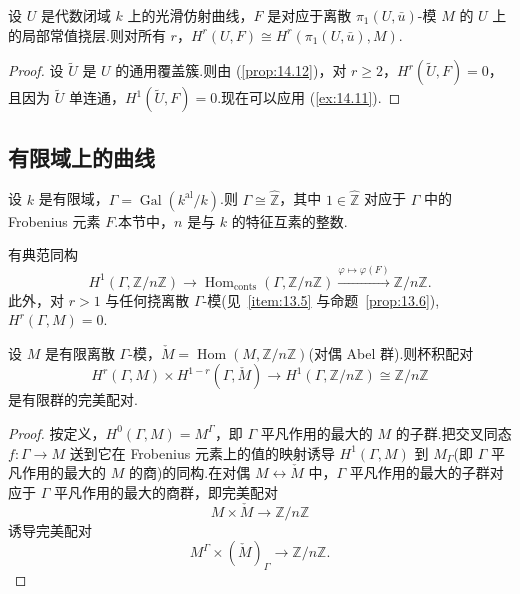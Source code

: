 \begin{theorem}\label{thm:14.14}
设 $U$ 是代数闭域 $k$ 上的光滑仿射曲线，$F$ 是对应于离散 $\pi_1(U, \bar{u})$-模 $M$ 的 $U$ 上的局部常值挠层.则对所有 $r$，$H^{r}(U, F) \cong H^{r}(\pi_1(U, \bar{u}), M)$.
\end{theorem}

\begin{proof}
设 $\widetilde{U}$ 是 $U$ 的通用覆盖簇.则由 (\ref{prop:14.12})，对 $r \geq 2$，$H^{r}(\widetilde{U}, F) = 0$，且因为 $\widetilde{U}$ 单连通，$H^{1}(\widetilde{U}, F) = 0$.现在可以应用 (\ref{ex:14.11}).
\end{proof}

\subsection*{有限域上的曲线}

设 $k$ 是有限域，$\Gamma = \operatorname{Gal}(k^{\mathrm{al}}/k)$.则 $\Gamma \cong \widehat{\mathbb{Z}}$，其中 $1 \in \widehat{\mathbb{Z}}$ 对应于 $\Gamma$ 中的 Frobenius 元素 $F$.本节中，$n$ 是与 $k$ 的特征互素的整数.

有典范同构
\[
H^{1}(\Gamma, \mathbb{Z}/n\mathbb{Z}) \to \operatorname{Hom}_{\mathrm{conts}}(\Gamma, \mathbb{Z}/n\mathbb{Z}) \xrightarrow{\varphi \mapsto \varphi(F)} \mathbb{Z}/n\mathbb{Z}.
\]
此外，对 $r > 1$ 与任何挠离散 $\Gamma$-模(见~\ref{item:13.5} 与命题~\ref{prop:13.6}), $H^{r}(\Gamma, M) = 0$.

\begin{proposition}\label{prop:14.15}
设 $M$ 是有限离散 $\Gamma$-模，$\check{M} = \operatorname{Hom}(M, \mathbb{Z}/n\mathbb{Z})$(对偶 Abel 群).则杯积配对
\[
H^{r}(\Gamma, M) \times H^{1-r}(\Gamma, \check{M}) \to H^{1}(\Gamma, \mathbb{Z}/n\mathbb{Z}) \cong \mathbb{Z}/n\mathbb{Z}
\]
是有限群的完美配对.
\end{proposition}

\begin{proof}
按定义，$H^{0}(\Gamma, M) = M^{\Gamma}$，即 $\Gamma$ 平凡作用的最大的 $M$ 的子群.把交叉同态 $f \colon \Gamma \to M$ 送到它在 Frobenius 元素上的值的映射诱导 $H^{1}(\Gamma, M)$ 到 $M_{\Gamma}$(即 $\Gamma$ 平凡作用的最大的 $M$ 的商)的同构.在对偶 $M \leftrightarrow \check{M}$ 中，$\Gamma$ 平凡作用的最大的子群对应于 $\Gamma$ 平凡作用的最大的商群，即完美配对
\[
M \times \check{M} \to \mathbb{Z}/n\mathbb{Z}
\]
诱导完美配对
\[
M^{\Gamma} \times (\check{M})_{\Gamma} \to \mathbb{Z}/n\mathbb{Z}.
\]
\end{proof}

